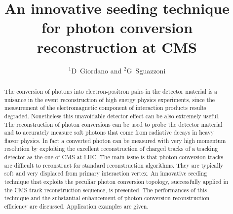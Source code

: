 \documentclass[a4paper]{jpconf}
\begin{document}
\title{An innovative seeding technique for photon conversion reconstruction at CMS}

\author{$^1$D~Giordano and $^2$G~Sguazzoni}

\address{$^1$CERN, Information Technology Department, Experiment Support Group, Geneva, Switzerland}
\address{$^2$INFN, Firenze, Italy}



\begin{abstract}
The conversion of photons into electron-positron pairs in the detector material is a nuisance in the event reconstruction of high energy physics experiments, since the measurement of the electromagnetic component of interaction products results degraded. Nonetheless this unavoidable detector effect can be also extremely useful. The reconstruction of photon conversions can be used to probe the detector material and to accurately measure soft photons that come from radiative decays in heavy flavor physics. In fact a converted photon can be measured with very high momentum resolution by exploiting the excellent reconstruction of charged tracks of a tracking detector as the one of CMS at LHC. The main issue is that photon conversion tracks are difficult to reconstruct for standard reconstruction algorithms. They are typically soft and very displaced from primary interaction vertex. An innovative seeding technique that exploits the peculiar photon conversion topology, successfully applied in the CMS track reconstruction sequence, is presented. The performances of this technique and the substantial enhancement of photon conversion reconstruction efficiency are discussed. Application examples are given.
\end{abstract}













\end{document}
